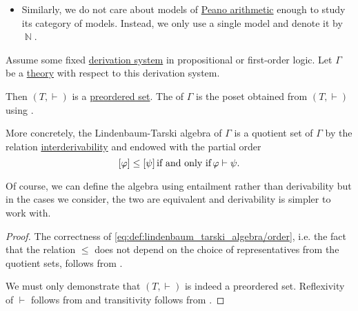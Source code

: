 \begin{example}
\begin{itemize}
    \item Similarly, we do not care about models of \hyperref[def:peano_arithmetic]{Peano arithmetic} enough to study its category of models. Instead, we only use a single model and denote it by \( \BbbN \).
  \end{itemize}
\end{example}

\begin{definition}\label{def:lindenbaum_tarski_algebra}
  Assume some fixed \hyperref[def:first_order_derivation_ystem]{derivation system} in propositional or first-order logic. Let \( \Gamma \) be a \hyperref[def:first_order_theory]{theory} with respect to this derivation system.

  Then \( (T, \vdash) \) is a \hyperref[def:preordered_set]{preordered set}. The  of \( \Gamma \) is the poset obtained from \( (T, \vdash) \) using .

  More concretely, the Lindenbaum-Tarski algebra of \( \Gamma \) is a quotient set of \( \Gamma \) by the relation \hyperref[def:first_order_derivability]{interderivability} and endowed with the partial order
  \begin{equation}\label{eq:def:lindenbaum_tarski_algebra/order}
    [\varphi] \leq [\psi] \T{if and only if} \varphi \vdash \psi.
  \end{equation}

  Of course, we can define the algebra using entailment rather than derivability but in the cases we consider, the two are equivalent and derivability is simpler to work with.
\end{definition}
\begin{proof}
  The correctness of \eqref{eq:def:lindenbaum_tarski_algebra/order}, i.e. the fact that the relation \( \leq \) does not depend on the choice of representatives from the quotient sets, follows from .

  We must only demonstrate that \( (T, \vdash) \) is indeed a preordered set. Reflexivity of \( \vdash \) follows from  and transitivity follows from .
\end{proof}

